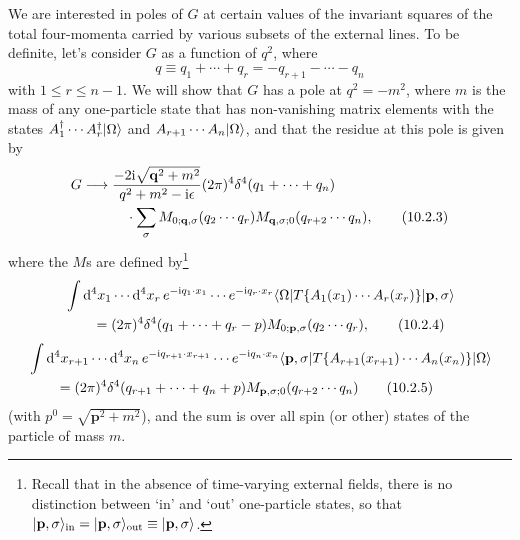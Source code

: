 We are interested in poles of $G$ at certain values of the invariant squares
of the total four-momenta carried by various subsets of the external lines.
To be definite, let's consider $G$ as a function of $q^2$, where
\begin{equation}
  q\equiv q_1+\cdots+q_r=-q_{r+1}-\cdots-q_n
  \tag{10.2.2}\label{eq:10.2.2}
\end{equation}
with $1\leq r\leq n-1$. We will show that $G$ has a pole at $q^2=-m^2$, where $m$ is
the mass of any one-particle state that has non-vanishing matrix elements
with the states $A_1^\dagger\cdots A_r^\dagger\lvert \Omega\rangle$ and
$A_{r+1}\cdots A_n\lvert \Omega\rangle$, and that the residue at this
pole is given by
\begin{align}
  G\longrightarrow{}&
  \frac{-2\mathrm{i}\sqrt{\mathbf q^2+m^2}}{q^2+m^2-\mathrm{i}\epsilon}
  (2\pi)^4\delta^4(q_1+\cdots+q_n)
  \notag\\
  &\quad\cdot\sum_\sigma
  M_{0;\mathbf q,\sigma}(q_2\cdots q_r)
  M_{\mathbf q,\sigma;0}(q_{r+2}\cdots q_n),
  \tag{10.2.3}\label{eq:10.2.3}
\end{align}
where the $M$s are defined by\footnote{Recall that in the absence of time-varying
external fields, there is no distinction between `in' and `out' one-particle
states, so that $\lvert \mathbf p,\sigma\rangle_{\mathrm{in}}
=\lvert \mathbf p,\sigma\rangle_{\mathrm{out}}
\equiv\lvert \mathbf p,\sigma\rangle$.}
\begin{align}
  &\int \mathop{}\!\mathrm{d}^4x_1\cdots \mathop{}\!\mathrm{d}^4x_r\,
  e^{-\mathrm{i} q_1\cdot x_1}\cdots e^{-\mathrm{i} q_r\cdot x_r}
  \langle \Omega\rvert T\{A_1(x_1)\cdots A_r(x_r)\}\lvert \mathbf p,\sigma\rangle
  \notag\\
  &\qquad=(2\pi)^4\delta^4(q_1+\cdots+q_r-p)
  M_{0;\mathbf p,\sigma}(q_2\cdots q_r),
  \tag{10.2.4}\label{eq:10.2.4}
\end{align}
\begin{align}
  &\int \mathop{}\!\mathrm{d}^4x_{r+1}\cdots \mathop{}\!\mathrm{d}^4x_n\,
  e^{-\mathrm{i} q_{r+1}\cdot x_{r+1}}\cdots e^{-\mathrm{i} q_n\cdot x_n}
  \langle \mathbf p,\sigma\rvert T\{A_{r+1}(x_{r+1})\cdots A_n(x_n)\}\lvert \Omega\rangle
  \notag\\
  &\qquad=(2\pi)^4\delta^4(q_{r+1}+\cdots+q_n+p)
  M_{\mathbf p,\sigma;0}(q_{r+2}\cdots q_n)
  \tag{10.2.5}\label{eq:10.2.5}
\end{align}
(with $p^0=\sqrt{\mathbf p^2+m^2}$), and the sum is over all spin (or other) states of the
particle of mass $m$.

